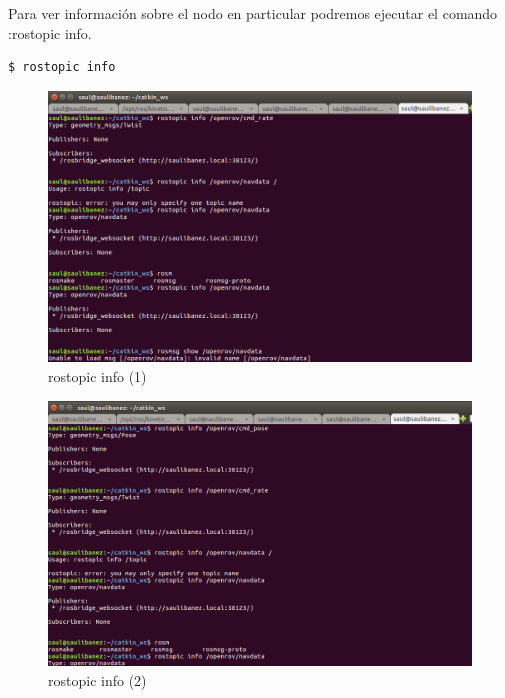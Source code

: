 Para ver información sobre el nodo en particular podremos ejecutar el comando :rostopic info.
\begin{lstlisting}[caption=rostopic info, label={lst:info}]
	$ rostopic info
\end{lstlisting}

\begin{figure} [hbtp]
  \begin{center}
    \includegraphics[width=12cm]{img/cap4/info1}
  \end{center}
  \caption{rostopic info (1)}
  \label{fig:rostopic_info}
\end{figure}
\begin{figure} [hbtp]
  \begin{center}
    \includegraphics[width=12cm]{img/cap4/info2}
  \end{center}
  \caption{rostopic info (2)}
  \label{fig:rostopic_info}
\end{figure}